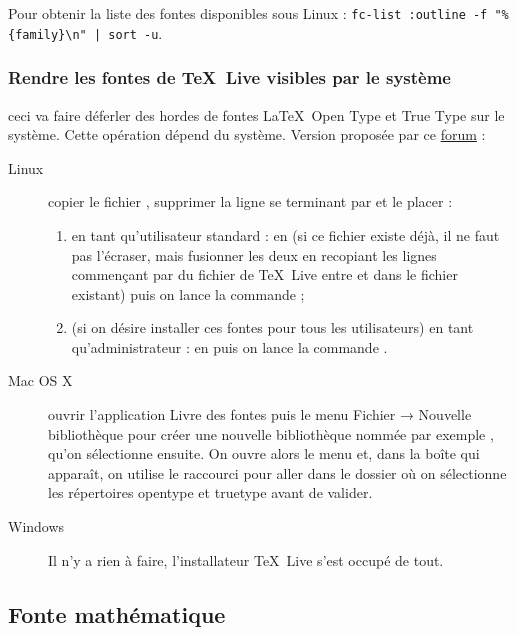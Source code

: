 Pour obtenir la liste des fontes disponibles sous Linux : \lstinline!fc-list :outline -f "%{family}\n" | sort -u!.


\subsubsection{Rendre les fontes de \TeX \ Live visibles par le système}

\attention ceci va faire déferler des hordes de fontes \LaTeX \ Open Type et True Type sur le système. Cette opération dépend du système. Version proposée par ce \href{http://texnique.fr/osqa/questions/115/listes-des-fontes-disponibles}{forum} :
\begin{description}
	\item[Linux] copier le fichier , supprimer la ligne se terminant par  et le placer :
	\begin{enumerate}
		\item en tant qu'utilisateur standard : en  (si ce fichier existe déjà, il ne faut pas l’écraser, mais fusionner les deux en recopiant les lignes commençant par  du fichier de \TeX \ Live entre  et  dans le fichier existant) puis on lance la commande ;
		\item (si on désire installer ces fontes pour tous les utilisateurs) en tant qu’administrateur : en \newline
		 puis on lance la commande .
	\end{enumerate}
	\item[Mac OS X] ouvrir l’application Livre des fontes puis le menu Fichier → Nouvelle bibliothèque pour créer une nouvelle bibliothèque nommée par exemple , qu’on sélectionne ensuite. On ouvre alors le menu  \textrightarrow {} et, dans la boîte qui apparaît, on utilise le raccourci  pour aller dans le dossier  où on sélectionne les répertoires opentype et truetype avant de valider.
	\item[Windows] Il n’y a rien à faire, l’installateur \TeX \ Live s’est occupé de tout.
\end{description}



\subsection{Fonte mathématique}

